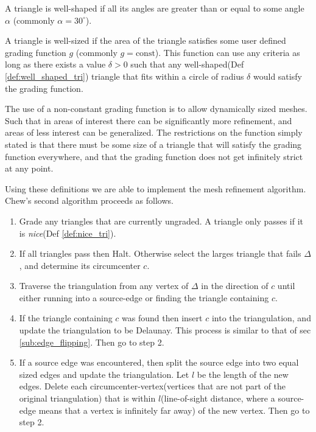 \documentclass[../fem.tex]{subfiles}
\begin{document}
\begin{definition}\label{def:well_shaped_tri}
  A triangle is well-shaped if all its angles are greater than or equal to some
  angle $\alpha$ (commonly $\alpha=30^{\circ}$).
\end{definition}

\begin{definition}\label{def:well_sized_tri}
  A triangle is well-sized if the area of the triangle satisfies some user
  defined grading function $g$ (commonly $g=\text{const}$). This function can
  use any criteria as long as there exists a value $\delta > 0$ such that any
  well-shaped(Def \ref{def:well_shaped_tri}) triangle that fits within a circle
  of radius $\delta$ would satisfy the grading function.
\end{definition}

The use of a non-constant grading function is to allow dynamically sized
meshes.  Such that in areas of interest there can be significantly more
refinement, and areas of less interest can be generalized. The restrictions on
the function simply stated is that there must be some size of a triangle that
will satisfy the grading function everywhere, and that the grading function
does not get infinitely strict at any point.

Using these definitions we are able to implement the mesh refinement algorithm.
Chew's second algorithm proceeds as follows.

\begin{enumerate}[label=\arabic*.]
  \item Grade any triangles that are currently ungraded. A triangle only passes
    if it is \textit{nice}(Def \ref{def:nice_tri}).
  \item If all triangles pass then Halt. Otherwise select the larges triangle
    that fails $\Delta$, and determine its circumcenter $c$.
  \item Traverse the triangulation from any vertex of $\Delta$ in the direction
    of $c$ until either running into a source-edge or finding the triangle
    containing $c$.
  \item If the triangle containing $c$ was found then insert $c$ into the
    triangulation, and update the triangulation to be Delaunay. This process is
    similar to that of sec \ref{sub:edge_flipping}. Then go to step 2.
  \item If a source edge was encountered, then split the source edge into two
    equal sized edges and update the triangulation. Let $l$ be the length of
    the new edges. Delete each circumcenter-vertex(vertices that are not part
    of the original triangulation) that is within $l$(line-of-sight distance,
    where a source-edge means that a vertex is infinitely far away) of the new
    vertex. Then go to step 2.
\end{enumerate}
\end{document}
